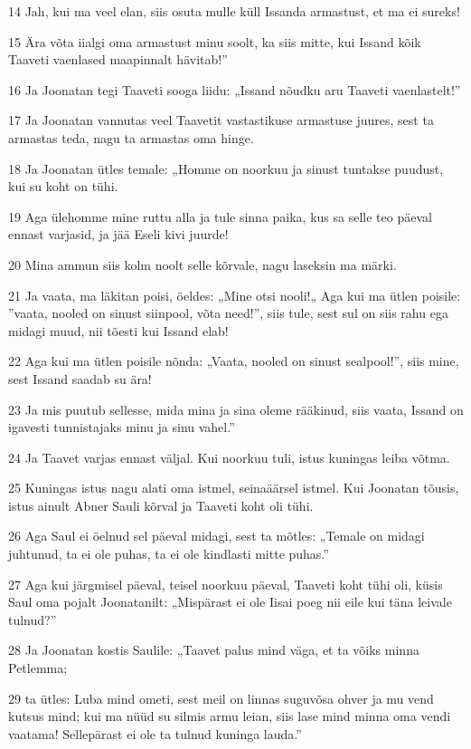 \par 14 Jah, kui ma veel elan, siis osuta mulle küll Issanda armastust, et ma ei sureks!
\par 15 Ära võta iialgi oma armastust minu soolt, ka siis mitte, kui Issand kõik Taaveti vaenlased maapinnalt hävitab!”
\par 16 Ja Joonatan tegi Taaveti sooga liidu: „Issand nõudku aru Taaveti vaenlastelt!”
\par 17 Ja Joonatan vannutas veel Taavetit vastastikuse armastuse juures, sest ta armastas teda, nagu ta armastas oma hinge.
\par 18 Ja Joonatan ütles temale: „Homme on noorkuu ja sinust tuntakse puudust, kui su koht on tühi.
\par 19 Aga ülehomme mine ruttu alla ja tule sinna paika, kus sa selle teo päeval ennast varjasid, ja jää Eseli kivi juurde!
\par 20 Mina ammun siis kolm noolt selle kõrvale, nagu laseksin ma märki.
\par 21 Ja vaata, ma läkitan poisi, öeldes: „Mine otsi nooli!„ Aga kui ma ütlen poisile: ”vaata, nooled on sinust siinpool, võta need!”, siis tule, sest sul on siis rahu ega midagi muud, nii tõesti kui Issand elab!
\par 22 Aga kui ma ütlen poisile nõnda: „Vaata, nooled on sinust sealpool!”, siis mine, sest Issand saadab su ära!
\par 23 Ja mis puutub sellesse, mida mina ja sina oleme rääkinud, siis vaata, Issand on igavesti tunnistajaks minu ja sinu vahel.”
\par 24 Ja Taavet varjas ennast väljal. Kui noorkuu tuli, istus kuningas leiba võtma.
\par 25 Kuningas istus nagu alati oma istmel, seinaäärsel istmel. Kui Joonatan tõusis, istus ainult Abner Sauli kõrval ja Taaveti koht oli tühi.
\par 26 Aga Saul ei öelnud sel päeval midagi, sest ta mõtles: „Temale on midagi juhtunud, ta ei ole puhas, ta ei ole kindlasti mitte puhas.”
\par 27 Aga kui järgmisel päeval, teisel noorkuu päeval, Taaveti koht tühi oli, küsis Saul oma pojalt Joonatanilt: „Mispärast ei ole Iisai poeg nii eile kui täna leivale tulnud?”
\par 28 Ja Joonatan kostis Saulile: „Taavet palus mind väga, et ta võiks minna Petlemma;
\par 29 ta ütles: Luba mind ometi, sest meil on linnas suguvõsa ohver ja mu vend kutsus mind; kui ma nüüd su silmis armu leian, siis lase mind minna oma vendi vaatama! Sellepärast ei ole ta tulnud kuninga lauda.”
